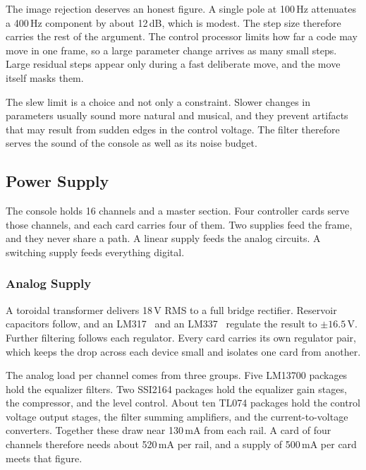 \documentclass[11pt, letterpaper,titlepage]{article}
\begin{document}
The image rejection deserves an honest figure. A single pole at 100\,Hz
attenuates a 400\,Hz component by about 12\,dB, which is modest. The step size
therefore carries the rest of the argument. The control processor limits how
far a code may move in one frame, so a large parameter change arrives as many
small steps. Large residual steps appear only during a fast deliberate move,
and the move itself masks them.

The slew limit is a choice and not only a constraint. Slower changes in parameters usually sound more natural and musical, and they prevent artifacts that may result from sudden edges in the control voltage. The filter
therefore serves the sound of the console as well as its noise budget.



\subsection{Power Supply}

\label{ssec:psu}

The console holds 16 channels and a master section. Four controller cards serve
those channels, and each card carries four of them. Two supplies feed the frame,
and they never share a path. A linear supply feeds the analog circuits. A
switching supply feeds everything digital.

\subsubsection*{Analog Supply}
\label{sssec:psu-analog}

A toroidal transformer delivers 18\,V RMS to a full bridge rectifier. Reservoir
capacitors follow, and an LM317~\cite{lm317} and an LM337~\cite{lm337} regulate the result to
$\pm 16.5$\,V. Further filtering follows each regulator. Every card carries its
own regulator pair, which keeps the drop across each device small and isolates
one card from another.

The analog load per channel comes from three groups. Five LM13700 packages hold
the equalizer filters. Two SSI2164 packages hold the equalizer gain stages, the
compressor, and the level control. About ten TL074 packages hold the control
voltage output stages, the filter summing amplifiers, and the current-to-voltage
converters. Together these draw near 130\,mA from each rail. A card of four
channels therefore needs about 520\,mA per rail, and a supply of 500\,mA per card
meets that figure.
\end{document}
